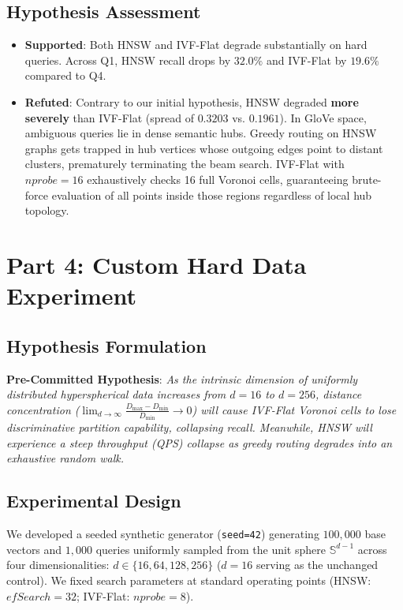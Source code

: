 \documentclass[10pt,twocolumn,a4paper]{article}
\begin{document}
\subsection{Hypothesis Assessment}
\begin{itemize}
    \item \textbf{Supported}: Both HNSW and IVF-Flat degrade substantially on hard queries. Across Q1, HNSW recall drops by $32.0\%$ and IVF-Flat by $19.6\%$ compared to Q4.
    \item \textbf{Refuted}: Contrary to our initial hypothesis, HNSW degraded \textbf{more severely} than IVF-Flat (spread of $0.3203$ vs. $0.1961$). In GloVe space, ambiguous queries lie in dense semantic hubs. Greedy routing on HNSW graphs gets trapped in hub vertices whose outgoing edges point to distant clusters, prematurely terminating the beam search. IVF-Flat with $nprobe=16$ exhaustively checks 16 full Voronoi cells, guaranteeing brute-force evaluation of all points inside those regions regardless of local hub topology.
\end{itemize}

\section{Part 4: Custom Hard Data Experiment}

\subsection{Hypothesis Formulation}
\textbf{Pre-Committed Hypothesis}: \textit{As the intrinsic dimension of uniformly distributed hyperspherical data increases from $d=16$ to $d=256$, distance concentration ($\lim_{d \to \infty} \frac{D_{\max} - D_{\min}}{D_{\min}} \to 0$) will cause IVF-Flat Voronoi cells to lose discriminative partition capability, collapsing recall. Meanwhile, HNSW will experience a steep throughput (QPS) collapse as greedy routing degrades into an exhaustive random walk.}

\subsection{Experimental Design}
We developed a seeded synthetic generator (\texttt{seed=42}) generating $100,000$ base vectors and $1,000$ queries uniformly sampled from the unit sphere $\mathbb{S}^{d-1}$ across four dimensionalities: $d \in \{16, 64, 128, 256\}$ ($d=16$ serving as the unchanged control). We fixed search parameters at standard operating points (HNSW: $efSearch=32$; IVF-Flat: $nprobe=8$).
\end{document}
